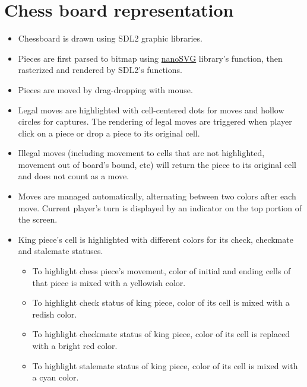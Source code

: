 \documentclass[a4paper, 10pt, titlepage]{report}
\begin{document}
\section{Chess board representation}
\begin{itemize}
  \item Chessboard is drawn using SDL2 graphic libraries.
  \item Pieces are first parsed to bitmap using \href{https://github.com/memononen/nanosvg}{nanoSVG} library's function, then rasterized and rendered by SDL2's functions.
  \item Pieces are moved by drag-dropping with mouse.
  \item Legal moves are highlighted with cell-centered dots for moves and hollow circles for captures. The rendering of legal moves are triggered when player click on a piece or drop a piece to its original cell.
  \item Illegal moves (including movement to cells that are not highlighted, movement out of board's bound, etc) will return the piece to its original cell and does not count as a move.
  \item Moves are managed automatically, alternating between two colors after each move. Current player's turn is displayed by an indicator on the top portion of the screen.
  \item King piece's cell is highlighted with different colors for its check, checkmate and stalemate statuses.
        \begin{itemize}
          \item To highlight chess piece's movement, color of initial and ending cells of that piece is mixed with a yellowish color.
          \item To highlight check status of king piece, color of its cell is mixed with a redish color.
          \item To highlight checkmate status of king piece, color of its cell is replaced with a bright red color.
          \item To highlight stalemate status of king piece, color of its cell is mixed with a cyan color.
        \end{itemize}
\end{itemize}
\end{document}

